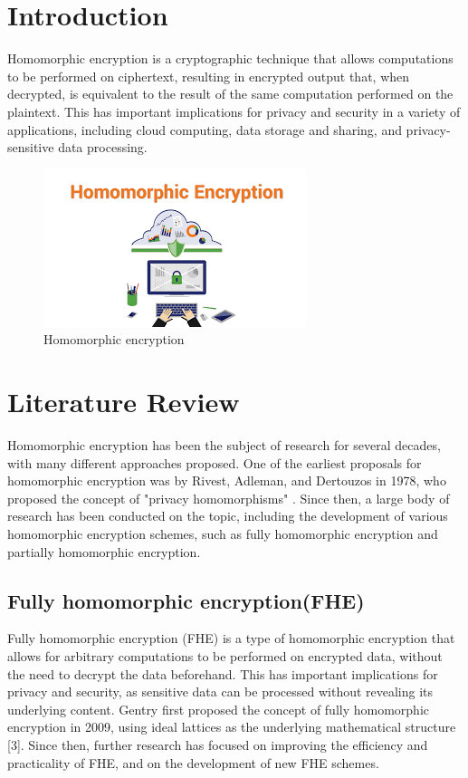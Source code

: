 \documentclass[conference]{IEEEtran}
\begin{document}
\section{Introduction}
Homomorphic encryption is a cryptographic technique that allows computations to be performed on ciphertext, resulting in encrypted output that, when decrypted, is equivalent to the result of the same computation performed on the plaintext. This has important implications for privacy and security in a variety of applications, including cloud computing, data storage and sharing, and privacy-sensitive data processing.
	\begin{figure}[h]
	\centering
	\includegraphics[width=1\linewidth]{he2.png}
	\caption{Homomorphic encryption}
	\label{fig:he2.png}
\end{figure}
\section{Literature Review}


Homomorphic encryption has been the subject of research for several decades, with many different approaches proposed. One of the earliest proposals for homomorphic encryption was by Rivest, Adleman, and Dertouzos in 1978, who proposed the concept of "privacy homomorphisms" . Since then, a large body of research has been conducted on the topic, including the development of various homomorphic encryption schemes, such as fully homomorphic encryption and partially homomorphic encryption.
\subsection{Fully homomorphic encryption(FHE)}
Fully homomorphic encryption (FHE) is a type of homomorphic encryption that allows for arbitrary computations to be performed on encrypted data, without the need to decrypt the data beforehand. This has important implications for privacy and security, as sensitive data can be processed without revealing its underlying content. Gentry first proposed the concept of fully homomorphic encryption in 2009, using ideal lattices as the underlying mathematical structure [3]. Since then, further research has focused on improving the efficiency and practicality of FHE, and on the development of new FHE schemes.
\end{document}
